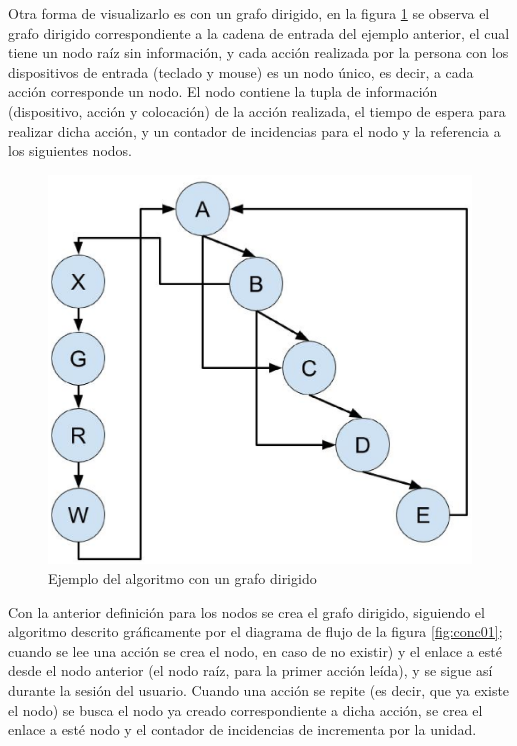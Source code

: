 
Otra forma de visualizarlo es con un grafo dirigido, en la figura
 \ref{fig:alg02} se observa el grafo dirigido correspondiente a la cadena
 de entrada del ejemplo anterior, el cual tiene un nodo ra\'iz sin 
 informaci\'on, y cada acci\'on realizada por la persona con los dispositivos
 de entrada (teclado y mouse) es un nodo \'unico, es decir, a cada acci\'on 
 corresponde un nodo. El nodo contiene la tupla de informaci\'on (dispositivo,
 acci\'on y colocaci\'on) de la acci\'on realizada, el tiempo de espera para
 realizar dicha acci\'on, y un contador de incidencias para el nodo y la
 referencia a los siguientes nodos.
 
\begin{figure}[h]
\centering
\includegraphics[width=0.5\columnwidth]{chap4/Imagenes/algoritmo2.eps}
\caption{Ejemplo del algoritmo con un grafo dirigido}
\label{fig:alg02}
\end{figure} 
 
Con la anterior definici\'on para los nodos se crea el grafo dirigido,
 siguiendo el algoritmo descrito gr\'aficamente por el diagrama de flujo 
 de la figura \ref{fig:conc01}; cuando se lee una acci\'on se crea el nodo,
 en caso de no existir) y el enlace a est\'e desde el nodo anterior (el nodo
 ra\'iz, para la primer acci\'on le\'ida), y se sigue as\'i durante la sesi\'on
 del usuario. Cuando una acci\'on se repite (es decir, que ya existe el nodo)
 se busca el nodo ya creado correspondiente a dicha acci\'on, se crea el enlace 
 a est\'e nodo y el contador de incidencias de incrementa por la unidad.


